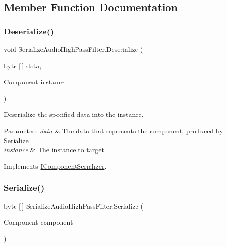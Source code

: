 \subsection{Member Function Documentation}
\mbox{\label{class_serialize_audio_high_pass_filter_a12318bb13445fae737731dc3e1d7172b}} 
\subsubsection{\texorpdfstring{Deserialize()}{Deserialize()}}
{\footnotesize\ttfamily void Serialize\+Audio\+High\+Pass\+Filter.\+Deserialize (\begin{DoxyParamCaption}\item[{byte \mbox{[}$\,$\mbox{]}}]{data,  }\item[{Component}]{instance }\end{DoxyParamCaption})\hspace{0.3cm}{\ttfamily [inline]}}



Deserialize the specified data into the instance. 


\begin{DoxyParams}{Parameters}
{\em data} & The data that represents the component, produced by Serialize \\
\hline
{\em instance} & The instance to target \\
\hline
\end{DoxyParams}


Implements \hyperlink{interface_i_component_serializer_a4cc366a5c78b33d47a90c209d8fed883}{I\+Component\+Serializer}.

\mbox{\label{class_serialize_audio_high_pass_filter_ae26f6c970a4912689ae3a7300fdc9139}} 
\subsubsection{\texorpdfstring{Serialize()}{Serialize()}}
{\footnotesize\ttfamily byte \mbox{[}$\,$\mbox{]} Serialize\+Audio\+High\+Pass\+Filter.\+Serialize (\begin{DoxyParamCaption}\item[{Component}]{component }\end{DoxyParamCaption})\hspace{0.3cm}{\ttfamily [inline]}}



